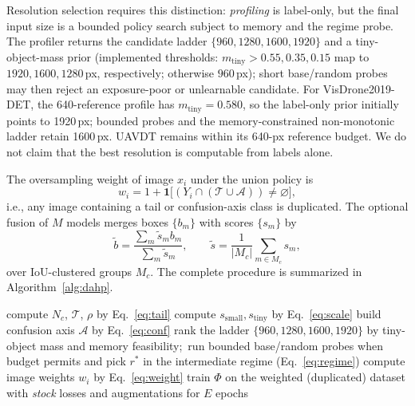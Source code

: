 \documentclass[journal]{IEEEtran}
\newcommand{\visdrone}{VisDrone2019-DET}
\newcommand{\uavdt}{UAVDT}
\begin{document}
Resolution selection requires this distinction: \emph{profiling} is label-only,
but the final input size is a bounded policy search subject to memory and the
regime probe. The profiler returns the candidate ladder
$\{960,1280,1600,1920\}$ and a tiny-object-mass prior (implemented thresholds:
$m_{\mathrm{tiny}}>0.55,0.35,0.15$ map to $1920,1600,1280$\,px, respectively;
otherwise $960$\,px); short base/random probes may then reject an
exposure-poor or unlearnable candidate. For \visdrone{}, the 640-reference
profile has $m_{\mathrm{tiny}}=0.580$, so the label-only prior initially points
to 1920\,px; bounded probes and the memory-constrained non-monotonic ladder
retain 1600\,px. \uavdt{} remains within its 640-px reference budget. We do
not claim that the best resolution is computable from labels alone.

The oversampling weight of image $x_i$ under the union policy is
\begin{equation}
w_i = 1 + \mathbf{1}\big[(Y_i\cap(\mathcal{T}\cup\mathcal{A}))\neq\varnothing\big],
\label{eq:weight}
\end{equation}
i.e., any image containing a tail or confusion-axis class is duplicated. The optional fusion of $M$ models merges boxes $\{b_m\}$ with scores $\{s_m\}$ by
\begin{equation}
\tilde{b}=\frac{\sum_m \tilde{s}_m b_m}{\sum_m \tilde{s}_m},\qquad
\tilde{s}=\frac{1}{|M_c|}\sum_{m\in M_c}s_m,
\label{eq:wbf}
\end{equation}
over IoU-clustered groups $M_c$. The complete procedure is summarized in Algorithm~\ref{alg:dahp}.

\begin{algorithm}[!t]
\caption{DAHP: profile, map, and train. Oversampling is policy-non-invasive; P2/resolution selection is an explicitly disclosed detector configuration.}
\label{alg:dahp}
\BlankLine
{}
compute $N_c$, $\mathcal{T}$, $\rho$ by Eq.~\eqref{eq:tail}\;
compute $s_{\mathrm{small}}, s_{\mathrm{tiny}}$ by Eq.~\eqref{eq:scale}\;
build confusion axis $\mathcal{A}$ by Eq.~\eqref{eq:conf}\;
rank the ladder $\{960,1280,1600,1920\}$ by tiny-object mass and memory feasibility;\ run bounded base/random probes when budget permits and pick $r^\ast$ in the intermediate regime (Eq.~\eqref{eq:regime})\;
compute image weights $w_i$ by Eq.~\eqref{eq:weight}\;
train $\Phi$ on the weighted (duplicated) dataset with \emph{stock} losses and augmentations for $E$ epochs\;
\Return{$\{\Phi^\ast\}$}\;
\end{algorithm}
\end{document}

